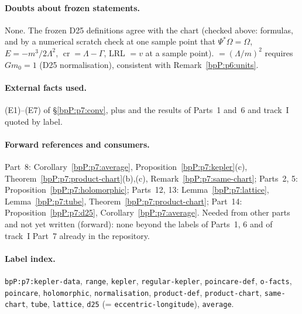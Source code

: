 \paragraph{Doubts about frozen statements.} None. The frozen D25 definitions agree with the chart (checked above: formulas, and by a numerical scratch check at one sample point that $\Psi^*\Omega=\Omega$, $E=-m^3/2\Lambda^2$, $\operatorname{cr}=\Lambda-\Gamma$, LRL $=v$ at a sample point). $=(\Lambda/m)^2$ requires $Gm_0=1$ (D25 normalisation), consistent with Remark~\ref{bpP:p6:units}.

\paragraph{External facts used.} (E1)--(E7) of \S\ref{bpP:p7:conv}, plus  and the results of Parts~1 and~6 and track~I quoted by label.

\paragraph{Forward references and consumers.} Part~8: Corollary~\ref{bpP:p7:average}, Proposition~\ref{bpP:p7:kepler}(c), Theorem~\ref{bpP:p7:product-chart}(b),(c), Remark~\ref{bpP:p7:same-chart}; Parts~2, 5: Proposition~\ref{bpP:p7:holomorphic}; Parts~12, 13: Lemma~\ref{bpP:p7:lattice}, Lemma~\ref{bpP:p7:tube}, Theorem~\ref{bpP:p7:product-chart}; Part~14: Proposition~\ref{bpP:p7:d25}, Corollary~\ref{bpP:p7:average}.
Needed from other parts and not yet written (forward): none beyond the labels of Parts~1, 6 and of track~I Part~7 already in the repository.

\paragraph{Label index.} \texttt{bpP:p7:kepler-data}, \texttt{range}, \texttt{kepler}, \texttt{regular-kepler}, \texttt{poincare-def}, \texttt{o-facts}, \texttt{poincare}, \texttt{holomorphic}, \texttt{normalisation}, \texttt{product-def}, \texttt{product-chart}, \texttt{same-chart}, \texttt{tube}, \texttt{lattice}, \texttt{d25} (= \texttt{eccentric-longitude}), \texttt{average}.
\par\endgroup
